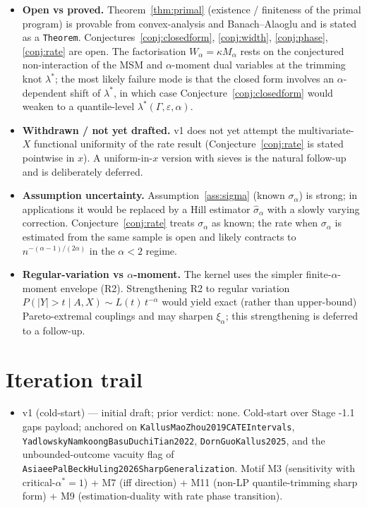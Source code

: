 \documentclass[11pt]{article}
\theoremstyle{definition}
\theoremstyle{plain}
\theoremstyle{remark}
\begin{document}
\begin{itemize}[leftmargin=2em]
  \item \textbf{Open vs proved.} Theorem~\ref{thm:primal} (existence / finiteness of the primal program) is provable from convex-analysis and Banach–Alaoglu and is stated as a \texttt{Theorem}. Conjectures~\ref{conj:closedform}, \ref{conj:width}, \ref{conj:phase}, \ref{conj:rate} are open. The factorisation $W_\alpha = \kappa M_\alpha$ rests on the conjectured non-interaction of the MSM and $\alpha$-moment dual variables at the trimming knot $\lambda^*$; the most likely failure mode is that the closed form involves an $\alpha$-dependent shift of $\lambda^*$, in which case Conjecture~\ref{conj:closedform} would weaken to a quantile-level $\lambda^*(\Gamma,\varepsilon,\alpha)$.
  \item \textbf{Withdrawn / not yet drafted.} v1 does not yet attempt the multivariate-$X$ functional uniformity of the rate result (Conjecture~\ref{conj:rate} is stated pointwise in $x$). A uniform-in-$x$ version with sieves is the natural follow-up and is deliberately deferred.
  \item \textbf{Assumption uncertainty.} Assumption~\ref{ass:sigma} (known $\sigma_\alpha$) is strong; in applications it would be replaced by a Hill estimator $\widehat{\sigma}_\alpha$ with a slowly varying correction. Conjecture~\ref{conj:rate} treats $\sigma_\alpha$ as known; the rate when $\sigma_\alpha$ is estimated from the same sample is open and likely contracts to $n^{-(\alpha-1)/(2\alpha)}$ in the $\alpha < 2$ regime.
  \item \textbf{Regular-variation vs $\alpha$-moment.} The kernel uses the simpler finite-$\alpha$-moment envelope (R2). Strengthening R2 to regular variation $P(|Y| > t \mid A,X) \sim L(t)\,t^{-\alpha}$ would yield exact (rather than upper-bound) Pareto-extremal couplings and may sharpen $\xi_\alpha$; this strengthening is deferred to a follow-up.
\end{itemize}

\section{Iteration trail}

\begin{itemize}[leftmargin=2em]
  \item v1 (cold-start) --- initial draft; prior verdict: none. Cold-start over Stage -1.1 gaps payload; anchored on \texttt{KallusMaoZhou2019CATEIntervals}, \texttt{YadlowskyNamkoongBasuDuchiTian2022}, \texttt{DornGuoKallus2025}, and the unbounded-outcome vacuity flag of \texttt{AsiaeePalBeckHuling2026SharpGeneralization}. Motif M3 (sensitivity with critical-$\alpha^* = 1$) + M7 (iff direction) + M11 (non-LP quantile-trimming sharp form) + M9 (estimation-duality with rate phase transition).
\end{itemize}
\end{document}
